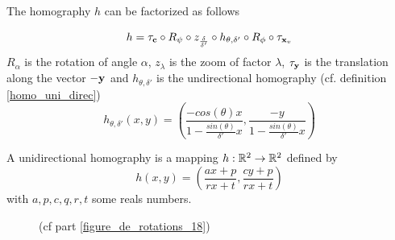 \begin{prop}
The homography $h$ can be factorized as follows
 
\begin{equation}
h = \tau_{\mathbf{c}}   \circ R_{\psi} \circ z_{\frac{\delta}{\delta'}} \circ h_{\theta,\delta'} \circ R_{\phi} \circ \tau_{\mathbf{x}_v}
\label{formul_decomp}
\end{equation}
 $R_{\alpha}$ is the rotation of angle $\alpha$, $z_\lambda$ is the zoom of factor $\lambda$, $\tau_{\mathbf{y}}$ is the translation along the vector $-\mathbf{y}$ and $h_{\theta,\delta'}$ is the undirectional homography (cf. definition \ref{homo_uni_direc})
\begin{equation}
h_{\theta,\delta'}(x,y)=\left(\frac{-cos(\theta)x}{1-\frac{sin(\theta)}{\delta'}x} ,\frac{-y}{1-\frac{sin(\theta)}{\delta'}x}\right)
\label{mise_perspective}
\end{equation}
\label{prop_decomp}
\end{prop}
\begin{Def}
A unidirectional homography is a mapping $h:\mathbb{R}^{2} \rightarrow \mathbb{R}^{2}$ defined by
\begin{equation*}
h(x,y)=\left ( \frac{ax+p}{rx+t} , \frac{cy+p}{rx+t} \right)
\end{equation*}
with $a,p,c,q,r,t$ some reals numbers.
\label{homo_uni_direc}
\end{Def}
\begin{figure}[h!]
\centering
{}
\caption{(cf part \ref{figure_de_rotations_18})}
\label{img_angles}
\end{figure}

